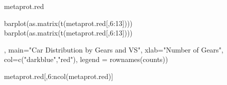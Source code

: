 metaprot.red



barplot(as.matrix(t(metaprot.red[,6:13])))
barplot(as.matrix(t(metaprot.red[,6:13])))


, main="Car Distribution by Gears and VS",
  xlab="Number of Gears", col=c("darkblue","red"),
  legend = rownames(counts))
  
  metaprot.red[,6:ncol(metaprot.red)]
